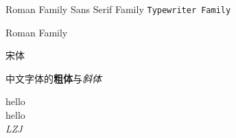 \documentclass{article}
\newcommand{\myfont}{\textit{\textrm{LZJ}}}
\begin{document}
	\textrm{Roman Family} \textsf{Sans Serif Family} \texttt{Typewriter Family}
	
	\rmfamily Roman Family
	
	{\songti 宋体}   
	
	中文字体的\textbf{粗体}与\textit{斜体}
	
	{\tiny hello}\\
	{\large hello}\\
	
	\myfont\\
\end{document}
